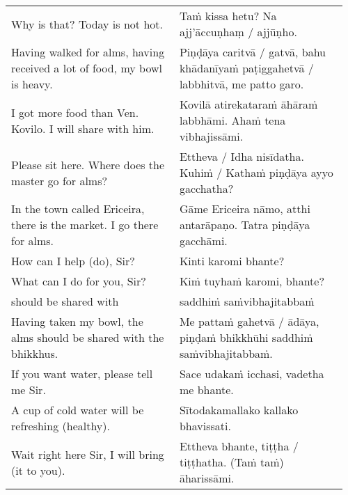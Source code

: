 \documentclass[a5paper]{memoir}
\begin{document}
\begin{longtable}{L{0.48\linewidth} L{0.48\linewidth}}
Why is that? Today is not hot. & Taṁ kissa hetu? Na ajj'āccuṇhaṃ / ajjūṇho.\\[0pt]
Having walked for alms, having received a lot of food, my bowl is heavy. & Piṇḍāya caritvā / gatvā, bahu khādanīyaṁ paṭiggahetvā / labbhitvā, me patto garo.\\[0pt]
I got more food than Ven. Kovilo. I will share with him. & Kovilā atirekataraṁ āhāraṁ labbhāmi. Ahaṁ tena vibhajissāmi.\\[0pt]
Please sit here. Where does the master go for alms? & Ettheva / Idha nisīdatha. Kuhiṁ / Kathaṁ piṇḍāya ayyo gacchatha?\\[0pt]
In the town called Ericeira, there is the market. I go there for alms. & Gāme Ericeira nāmo, atthi antarāpaṇo. Tatra piṇḍāya gacchāmi.\\[0pt]
How can I help (do), Sir? & Kinti karomi bhante?\\[0pt]
What can I do for you, Sir? & Kiṁ tuyhaṁ karomi, bhante?\\[0pt]
should be shared with & saddhiṁ saṁvibhajitabbaṁ\\[0pt]
Having taken my bowl, the alms should be shared with the bhikkhus. & Me pattaṁ gahetvā / ādāya, piṇḍaṁ bhikkhūhi saddhiṁ saṁvibhajitabbaṁ.\\[0pt]
If you want water, please tell me Sir. & Sace udakaṁ icchasi, vadetha me bhante.\\[0pt]
A cup of cold water will be refreshing (healthy). & Sītodakamallako kallako bhavissati.\\[0pt]
Wait right here Sir, I will bring (it to you). & Ettheva bhante, tiṭṭha / tiṭṭhatha. (Taṁ taṁ) āharissāmi.\\[0pt]
\end{longtable}
\end{document}
